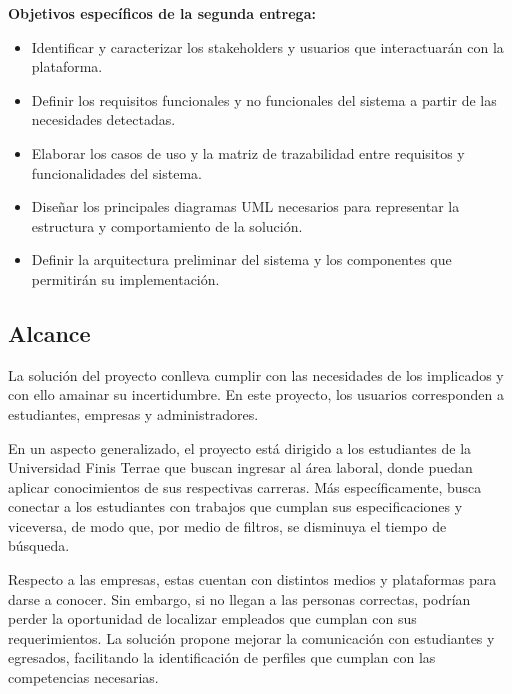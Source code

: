 \documentclass[11pt,a4paper]{Plantilla}
\begin{document}
\textbf{Objetivos específicos de la segunda entrega:}
\begin{itemize}
    \item Identificar y caracterizar los stakeholders y usuarios que interactuarán con la plataforma.

    \item Definir los requisitos funcionales y no funcionales del sistema a partir de las necesidades detectadas.

    \item Elaborar los casos de uso y la matriz de trazabilidad entre requisitos y funcionalidades del sistema.

    \item Diseñar los principales diagramas UML necesarios para representar la estructura y comportamiento de la solución.

    \item Definir la arquitectura preliminar del sistema y los componentes que permitirán su implementación.

\end{itemize}
\subsection{Alcance}%
La solución del proyecto conlleva cumplir con las necesidades de los implicados y con ello amainar su incertidumbre. En este proyecto, los usuarios corresponden a estudiantes, empresas y administradores. 

\vspace{5pt}

En un aspecto generalizado, el proyecto está dirigido a los estudiantes de la Universidad Finis Terrae que buscan ingresar al área laboral, donde puedan aplicar conocimientos de sus respectivas carreras. Más específicamente, busca conectar a los estudiantes con trabajos que cumplan sus especificaciones y viceversa, de modo que, por medio de filtros, se disminuya el tiempo de búsqueda.

\vspace{5pt}

Respecto a las empresas, estas cuentan con distintos medios y plataformas para darse a conocer. Sin embargo, si no llegan a las personas correctas, podrían perder la oportunidad de localizar empleados que cumplan con sus requerimientos. La solución propone mejorar la comunicación con estudiantes y egresados, facilitando la identificación de perfiles que cumplan con las competencias necesarias.
\end{document}
